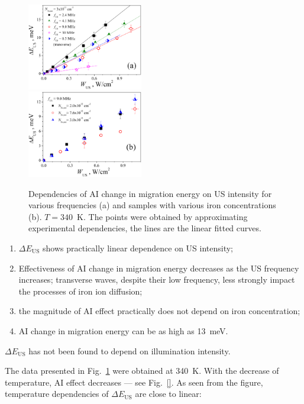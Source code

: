 \documentclass[%
 aip,jap,
 amsmath,amssymb,
 reprint,%
]{revtex4-1}
\begin{document}
\begin{figure}
\includegraphics[width=0.45\textwidth]{Fig7a}\\%
\includegraphics[width=0.45\textwidth]{Fig7b}%
\caption{\label{Fig:EmWus}
Dependencies of AI change in migration energy on US intensity for various 
frequencies (a) and samples with various iron concentrations (b). 
$T=340$~K. 
The points were obtained by approximating experimental dependencies, 
the lines are the linear fitted curves.
}
\end{figure}


\begin{enumerate}
  \item $\Delta E_\mathrm{US}$ shows practically linear dependence on US intensity;
  \item Effectiveness of AI change in migration energy decreases as the US frequency increases; transverse waves, despite their low frequency, less strongly impact the processes of iron ion diffusion;
  \item the magnitude of AI effect practically does not depend on iron concentration;
  \item AI change in migration energy can be as high as 13~meV.
\end{enumerate}

$\Delta E_\mathrm{US}$ has not been found to depend on illumination intensity.

The data presented in Fig.~\ref{Fig:EmWus} were obtained at 340~K. 
With the decrease of temperature, AI effect  decreases –-- see Fig.~\ref{}. 
As seen from the figure, temperature dependencies of $\Delta E_\mathrm{US}$ are close to linear:
\end{document}
